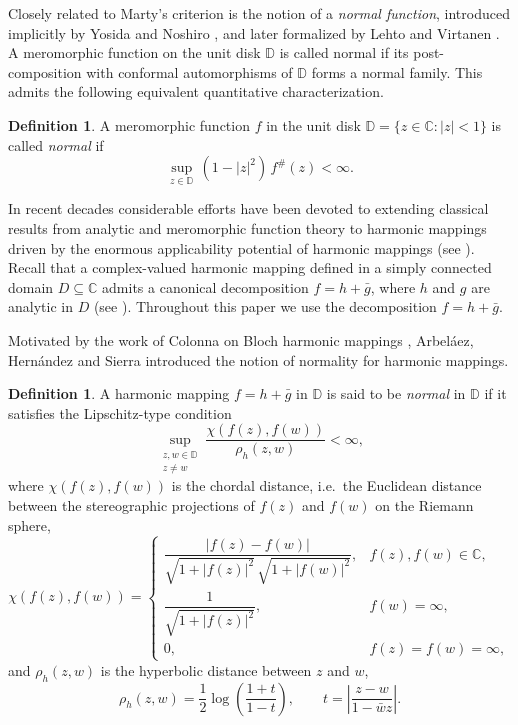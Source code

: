 \documentclass[11pt,reqno]{amsart}
\theoremstyle{definition}
\newtheorem{definition}[theorem]{Definition}
\newcommand{\D}{\mathbb{D}}
\newcommand{\C}{\mathbb{C}}
\begin{document}
Closely related to Marty's criterion is the notion of a \emph{normal function}, introduced
implicitly by Yosida \cite{Yosida} and Noshiro \cite{Noshiro}, and later formalized by
Lehto and Virtanen \cite{LehtoVirtanen}. A meromorphic function on the unit disk $\D$ is
called normal if its post-composition with conformal automorphisms of $\D$ forms a normal
family. This admits the following equivalent quantitative characterization.

\begin{definition}\label{def:normalmero}
A meromorphic function $f$ in the unit disk $\D=\{z\in\C:|z|<1\}$ is called \emph{normal} if
\[
\sup_{z\in\D}\,(1-|z|^{2})\,f^{\#}(z)<\infty.
\]
\end{definition}

In recent decades considerable efforts have been devoted to extending classical results from
analytic and meromorphic function theory to harmonic mappings driven by the enormous applicability potential of harmonic mappings (see \cite{ACA, OCM}). Recall that a complex-valued harmonic mapping defined in a simply connected domain $D\subseteq\C$ admits a canonical
decomposition $f=h+\bar g$, where $h$ and $g$ are analytic in $D$ (see \cite{Duren}).
Throughout this paper we use the decomposition $f=h+\bar g$.

Motivated by the work of Colonna on Bloch harmonic mappings \cite{Colonna}, Arbel\'aez,
Hern\'andez and Sierra \cite{AHS} introduced the notion of normality for harmonic mappings.

\begin{definition}\label{def:normalharm}
A harmonic mapping $f=h+\bar g$ in $\D$ is said to be \emph{normal} in $\D$ if it satisfies
the Lipschitz-type condition
\[
\sup_{\substack{z,w\in\D\\ z\neq w}}\frac{\chi(f(z),f(w))}{\rho_{h}(z,w)}<\infty,
\]
where $\chi(f(z),f(w))$ is the chordal distance, i.e.\ the Euclidean distance between the
stereographic projections of $f(z)$ and $f(w)$ on the Riemann sphere,
\[
\chi(f(z),f(w))=
\begin{cases}
\dfrac{|f(z)-f(w)|}{\sqrt{1+|f(z)|^{2}}\,\sqrt{1+|f(w)|^{2}}}, & f(z),f(w)\in\C,\\[2.2ex]
\dfrac{1}{\sqrt{1+|f(z)|^{2}}}, & f(w)=\infty,\\[2.2ex]
0, & f(z)=f(w)=\infty,
\end{cases}
\]
and $\rho_{h}(z,w)$ is the hyperbolic distance between $z$ and $w$,
\[
\rho_{h}(z,w)=\frac12\log\!\left(\frac{1+t}{1-t}\right),\qquad
t=\left|\frac{z-w}{1-\bar w z}\right|.
\]
\end{definition}
\end{document}
